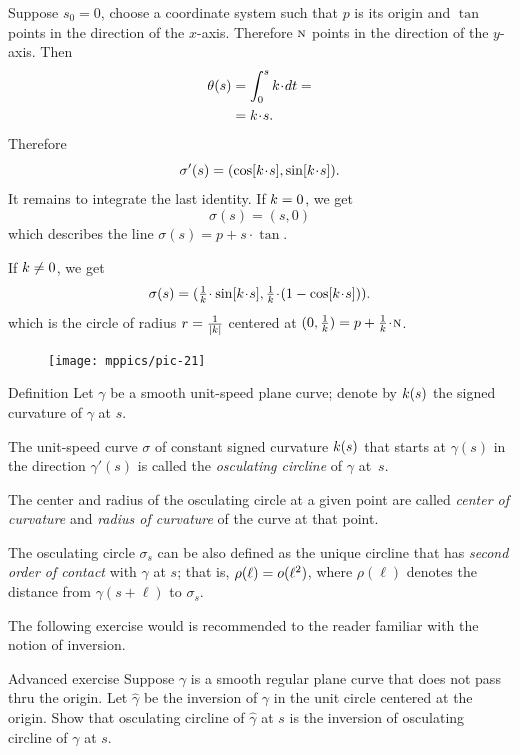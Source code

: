 Suppose $s_0=0$, choose a coordinate system such that $p$ is its origin and $\tan$ points in the direction of the $x$-axis. Therefore $\textsc{n}$ points in the direction of the $y$-axis.
Then
\begin{align*}\theta(s)&=\int_{0}^s\skur\cdot dt=
\\
&=\skur\cdot s.
\end{align*}
Therefore
\[\sigma'(s)=(\cos[\skur\cdot s],\sin[\skur\cdot s]).\]
It remains to integrate the last identity.
If $k=0$, we get 
\[\sigma(s)=(s,0)\]
which describes the line $\sigma(s)=p+s\cdot \tan$.

If $k\ne 0$, we get
\[\sigma(s)=(\tfrac1\skur\cdot\sin[\skur\cdot s],
\tfrac1\skur\cdot(1-\cos[\skur\cdot s])).\]
which is the circle of radius $r=\tfrac1{|k|}$ centered at $(0,\tfrac1\skur)=p+\tfrac1\skur\cdot\norm$.
\qeds


\begin{figure}
\vskip-0mm
\centering
\texttt{[image: mppics/pic-21]}
\vskip0mm
\end{figure}

\begin{thm}{Definition}
Let $\gamma$ be a smooth unit-speed plane curve;
denote by $k(s)$ the signed curvature of $\gamma$ at $s$.

The unit-speed curve $\sigma$ of constant signed curvature $k(s)$ that starts at $\gamma(s)$ in the direction $\gamma'(s)$ is called the \emph{osculating circline} of $\gamma$ at~$s$.

The center and radius of the osculating circle at a given point are called \emph{center of curvature} and \emph{radius of curvature} of the curve at that point.
\end{thm}

The osculating circle $\sigma_s$ can be also defined as the unique circline that has \emph{second order of contact} with $\gamma$ at $s$;
that is, $\rho(\ell)\z=o(\ell^2)$, where $\rho(\ell)$ denotes the distance from $\gamma(s+\ell)$ to $\sigma_s$.

The following exercise would is recommended to the reader familiar with the notion of inversion.

\begin{thm}{Advanced exercise}\label{ex:inverse}
Suppose $\gamma$ is a smooth regular plane curve that does not pass thru the origin.
Let $\hat \gamma$ be the inversion of $\gamma$ in the unit circle centered at the origin.
Show that osculating circline of $\hat\gamma$ at $s$ is the inversion of osculating circline of $\gamma$ at $s$.
\end{thm}


